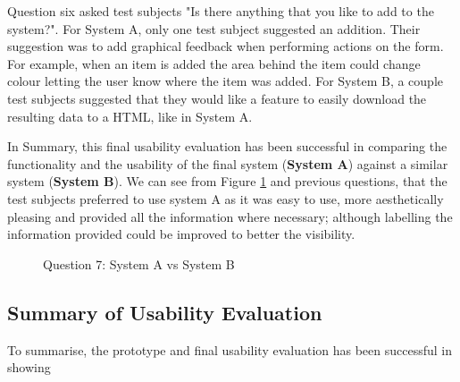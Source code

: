 \newpage
Question six asked test subjects "Is there anything that you like to add to the system?". For System A, only one test subject suggested an addition. Their suggestion was to add graphical feedback when performing actions on the form. For example, when an item is added the area behind the item could change colour letting the user know where the item was added. For System B, a couple test subjects suggested that they would like a feature to easily download the resulting data to a HTML, like in System A.

In Summary, this final usability evaluation has been successful in comparing the functionality and the usability of the final system (\textbf{System A}) against a similar system (\textbf{System B}). We can see from Figure \ref{fig:finalQ8} and previous questions, that the test subjects preferred to use system A as it was easy to use, more aesthetically pleasing and provided all the information where necessary; although labelling the information provided could be improved to better the visibility.\newline

\begin{figure}[!h]
  \centering
  \begin{minipage}[b]{0.47\textwidth}
    \caption{Question 7: System A vs System B}
    \label{fig:finalQ8}
  \end{minipage}
\end{figure}


\subsection{Summary of Usability Evaluation}
To summarise, the prototype and final usability evaluation has been successful in showing

